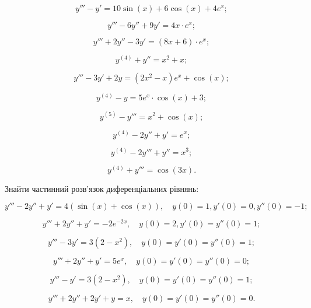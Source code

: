 \begin{multicols}{2}
\begin{problem}
	\[y'''-y'=10\sin(x)+6\cos(x)+4e^x;\]
\end{problem}
\begin{problem}
	\[y'''-6y''+9y'=4x\cdot e^x;\]
\end{problem}
\begin{problem}
	\[y'''+2y''-3y'=(8x+6)\cdot e^x;\]
\end{problem}
\begin{problem}
	\[y^{(4)}+y''=x^2+x;\]
\end{problem}
\begin{problem}
	\[y'''-3y'+2y=(2x^2-x) e^x+\cos(x);\]
\end{problem}
\begin{problem}
	\[y^{(4)}-y=5e^x\cdot\cos(x)+3;\]
\end{problem}
\begin{problem}
	\[y^{(5)}-y'''=x^2+\cos(x);\]
\end{problem}
\begin{problem}
	\[y^{(4)}-2y''+y'=e^x;\]
\end{problem}
\begin{problem}
	\[y^{(4)}-2y'''+y''=x^3;\]
\end{problem}
\begin{problem}
	\[y^{(4)}+y'''=\cos(3x).\]
\end{problem}
\end{multicols}

Знайти частинний розв’язок диференціальних рівнянь:
\begin{problem}
	\[y'''-2y''+y'=4(\sin(x)+\cos(x)),\quad y(0)=1,y'(0)=0,y''(0)=-1;\]
\end{problem}
\begin{problem}
	\[y'''+2y''+y'=-2e^{-2x},\quad y(0)=2,y'(0)=y''(0)=1;\]
\end{problem}
\begin{problem}
	\[y'''-3y'=3(2-x^2),\quad y(0)=y'(0)=y''(0)=1;\]
\end{problem}
\begin{problem}
	\[y'''+2y''+y'=5e^x,\quad y(0)=y'(0)=y''(0)=0;\]
\end{problem}
\begin{problem}
	\[y'''-y'=3(2-x^2),\quad y(0)=y'(0)=y''(0)=1;\]
\end{problem}
\begin{problem}
	\[y'''+2y''+2y'+y=x,\quad y(0)=y'(0)=y''(0)=0.\]
\end{problem}
